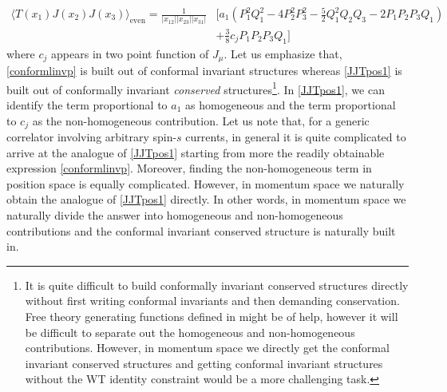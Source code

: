 \documentclass[a4paper,11pt]{article}
\begin{document}
\begin{align}\label{JJTpos1}
\langle T(x_1) J(x_2) J(x_3) \rangle_{\text{even}} =   \frac{1}{|x_{12}|| x_{23}||x_{31}|}&\Big[a_1 \left(P_1^2 Q_1^2 -4 P_2^2 P_3^2 - \frac{5}{2} Q_1^2 Q_2 Q_3-2 P_1 P_2 P_3 Q_1\right) \nonumber\\
&+\frac{3}{8} c_j P_1 P_2 P_3 Q_1\Big]  
\end{align} where $c_j$ appears in two point function of $J_{\mu}.$ Let us emphasize that, \eqref{conformlinvp} is built out of conformal invariant structures whereas \eqref{JJTpos1} is built out of conformally invariant {\it conserved} structures\footnote{It is quite difficult to build conformally invariant conserved structures directly without first writing conformal invariants and then demanding conservation. Free theory generating functions defined in \cite{Giombi:2011rz} might be of help, however it will be difficult to separate out the homogeneous and non-homogeneous contributions. However, in momentum space we directly get the conformal invariant conserved structures and getting conformal invariant structures without the WT identity constraint would be a more challenging task.}. In \eqref{JJTpos1}, we can identify the term proportional to $a_1$ as homogeneous and the term proportional to $c_j$ as the non-homogeneous contribution. Let us note that, for a generic correlator involving arbitrary spin-$s$ currents, in general it is quite complicated to arrive at the analogue of \eqref{JJTpos1} starting from more the readily obtainable expression \eqref{conformlinvp}. Moreover, finding the non-homogeneous term in position space is equally complicated. However, in momentum space we naturally obtain the analogue of \eqref{JJTpos1} directly. In other words, in momentum space we naturally divide the answer into homogeneous and non-homogeneous contributions and the conformal invariant conserved structure is naturally built in. 
\end{document}
